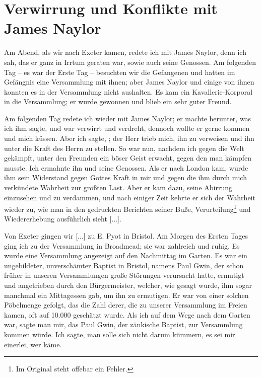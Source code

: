\section{Verwirrung und Konflikte mit James Naylor}

Am Abend, als wir nach Exeter kamen, redete ich mit James
Naylor, denn ich sah, das er ganz in Irrtum geraten war, sowie
auch seine Genossen. Am folgenden Tag -- es war der Erste
Tag -- besuchten wir die Gefangenen und hatten im Gefängnis
eine Versammlung mit ihnen; aber James Naylor und einige
von ihnen konnten es in der Versammlung nicht aushalten. Es
kam ein Kavallerie-Korporal in die Versammlung; er wurde 
gewonnen und blieb ein sehr guter Freund.


Am folgenden Tag redete ich wieder mit James Naylor; er
machte herunter, was ich ihm sagte, und war verwirrt und 
verdreht, dennoch wollte er gerne kommen und mich küssen. Aber
ich sagte, ; 
der Herr trieb mich, ihn zu verweisen und ihn unter die Kraft 
des Herrn zu stellen. So war nun, nachdem ich gegen die Welt 
gekämpft, unter den Freunden ein böser Geist erwacht, gegen 
den man kämpfen musste. Ich ermahnte ihn und seine Genossen. 
Als er nach London kam, wurde ihm sein Widerstand 
gegen Gottes Kraft in
mir und gegen die ihm durch mich verkündete Wahrheit zur
größten Last. Aber er kam dazu, seine Abirrung einzusehen und
zu verdammen, und nach einiger Zeit kehrte er 
sich der Wahrheit
wieder zu, wie man in den gedruckten Berichten seiner Buße,
Verurteilung\footnote{Im Original steht 
 offebar ein Fehler.} und 
Wiedererhebung ausführlich sieht [...].

Von Exeter gingen wir [...] zu E. Pyot 
in Bristol. Am
Morgen des Ersten Tages ging ich zu der Versammlung in
Broadmead; sie war zahlreich und ruhig. 
Es wurde eine Versammlung angezeigt auf den Nachmittag 
im Garten. Es war
ein ungebildeter, unverschämter Baptist in Bristol, namens Paul
Gwin, der schon früher in unseren 
Versammlungen große Störungen
verursacht hatte, ermutigt und angetrieben durch den 
Bürgermeister, welcher, wie gesagt wurde, ihm sogar manchmal ein
Mittagessen gab, um ihn zu ermutigen. Er war von einer
solchen Pöbelmenge gefolgt, das die Zahl derer, die zu unserer
Versammlung im Freien kamen, oft auf 10.000 geschätzt 
wurde.
Als ich auf dem Wege nach dem Garten war, sagte man mir,
das Paul Gwin, der zänkische Baptist, zur Versammlung kommen
würde. Ich sagte, man solle sich nicht darum kümmern, es sei
mir einerlei, wer käme. 


